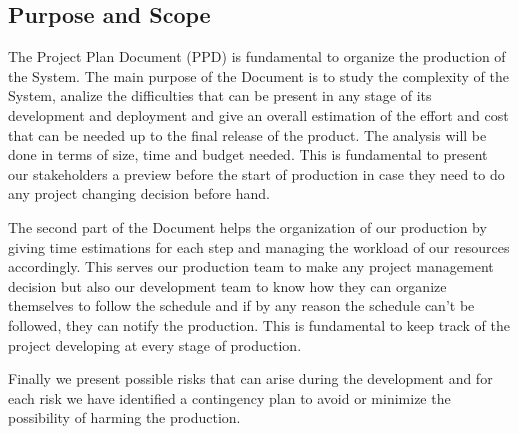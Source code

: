 \documentclass[a4paper]{article}
\begin{document}
\subsection{Purpose and Scope}
The Project Plan Document (PPD) is fundamental to organize the production of the System. The main purpose of the Document is to study the complexity of the System, analize the difficulties that can be present in any stage of its development and deployment and give an overall estimation of the effort and cost that can be needed up to the final release of the product. The analysis will be done in terms of size, time and budget needed. This is fundamental to present our stakeholders a  preview before the start of production in case they need to do any project changing decision before hand.\par 
The second part of the Document helps the organization of our production by giving time estimations for each step and managing the workload of our resources accordingly. This serves our production team to make any project management decision but also our development team to know how they can organize themselves to follow the schedule and if by any reason the schedule can't be followed, they can notify the production. This is fundamental to keep track of the project developing at every stage of production.\par
Finally we present possible risks that can arise during the development and for each risk we have identified a contingency plan to avoid or minimize the possibility of harming the production.
\end{document}
